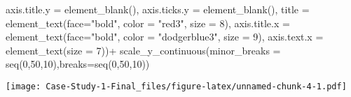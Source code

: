 \documentclass[
]{article}
\newenvironment{Shaded}{\begin{snugshade}}{\end{snugshade}}
\newcommand{\AttributeTok}[1]{\textcolor[rgb]{0.77,0.63,0.00}{#1}}
\newcommand{\DecValTok}[1]{\textcolor[rgb]{0.00,0.00,0.81}{#1}}
\newcommand{\FunctionTok}[1]{\textcolor[rgb]{0.00,0.00,0.00}{#1}}
\newcommand{\NormalTok}[1]{#1}
\newcommand{\SpecialCharTok}[1]{\textcolor[rgb]{0.00,0.00,0.00}{#1}}
\newcommand{\StringTok}[1]{\textcolor[rgb]{0.31,0.60,0.02}{#1}}
\begin{document}
\begin{Shaded}
\begin{Highlighting}[]
        \AttributeTok{axis.title.y =} \FunctionTok{element\_blank}\NormalTok{(),}
        \AttributeTok{axis.ticks.y =} \FunctionTok{element\_blank}\NormalTok{(),}
        \AttributeTok{title =} \FunctionTok{element\_text}\NormalTok{(}\AttributeTok{face=}\StringTok{"bold"}\NormalTok{, }\AttributeTok{color =} \StringTok{"red3"}\NormalTok{, }\AttributeTok{size =} \DecValTok{8}\NormalTok{),}
        \AttributeTok{axis.title.x =} \FunctionTok{element\_text}\NormalTok{(}\AttributeTok{face=}\StringTok{"bold"}\NormalTok{, }\AttributeTok{color =} \StringTok{"dodgerblue3"}\NormalTok{, }\AttributeTok{size =} \DecValTok{9}\NormalTok{),}
        \AttributeTok{axis.text.x =} \FunctionTok{element\_text}\NormalTok{(}\AttributeTok{size =} \DecValTok{7}\NormalTok{))}\SpecialCharTok{+}
  \FunctionTok{scale\_y\_continuous}\NormalTok{(}\AttributeTok{minor\_breaks =} \FunctionTok{seq}\NormalTok{(}\DecValTok{0}\NormalTok{,}\DecValTok{50}\NormalTok{,}\DecValTok{10}\NormalTok{),}\AttributeTok{breaks=}\FunctionTok{seq}\NormalTok{(}\DecValTok{0}\NormalTok{,}\DecValTok{50}\NormalTok{,}\DecValTok{10}\NormalTok{))}
\end{Highlighting}
\end{Shaded}

\texttt{[image: Case-Study-1-Final\_files/figure-latex/unnamed-chunk-4-1.pdf]}
\end{document}
